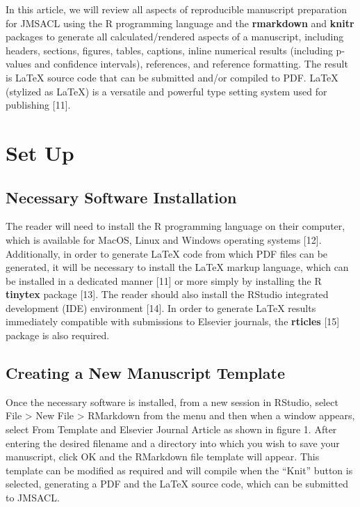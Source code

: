 \documentclass[]{elsarticle} %
\begin{document}
In this article, we will review all aspects of reproducible manuscript
preparation for JMSACL using the R programming language and the
\textbf{rmarkdown} and \textbf{knitr} packages to generate all
calculated/rendered aspects of a manuscript, including headers,
sections, figures, tables, captions, inline numerical results (including
p-values and confidence intervals), references, and reference
formatting. The result is LaTeX source code that can be submitted and/or
compiled to PDF. LaTeX (stylized as \LaTeX) is a versatile and powerful
type setting system used for publishing {[}11{]}.

\hypertarget{set-up}{%
\section{Set Up}\label{set-up}}

\hypertarget{necessary-software-installation}{%
\subsection{Necessary Software
Installation}\label{necessary-software-installation}}

The reader will need to install the R programming language on their
computer, which is available for MacOS, Linux and Windows operating
systems {[}12{]}. Additionally, in order to generate LaTeX code from
which PDF files can be generated, it will be necessary to install the
LaTeX markup language, which can be installed in a dedicated manner
{[}11{]} or more simply by installing the R \textbf{tinytex} package
{[}13{]}. The reader should also install the RStudio integrated
development (IDE) environment {[}14{]}. In order to generate LaTeX
results immediately compatible with submissions to Elsevier journals,
the \textbf{rticles} {[}15{]} package is also required.

\hypertarget{creating-a-new-manuscript-template}{%
\subsection{Creating a New Manuscript
Template}\label{creating-a-new-manuscript-template}}

Once the necessary software is installed, from a new session in RStudio,
select File \textgreater{} New File \textgreater{} RMarkdown from the
menu and then when a window appears, select From Template and Elsevier
Journal Article as shown in figure 1. After entering the desired
filename and a directory into which you wish to save your manuscript,
click OK and the RMarkdown file template will appear. This template can
be modified as required and will compile when the ``Knit'' button is
selected, generating a PDF and the LaTeX source code, which can be
submitted to JMSACL.
\end{document}
